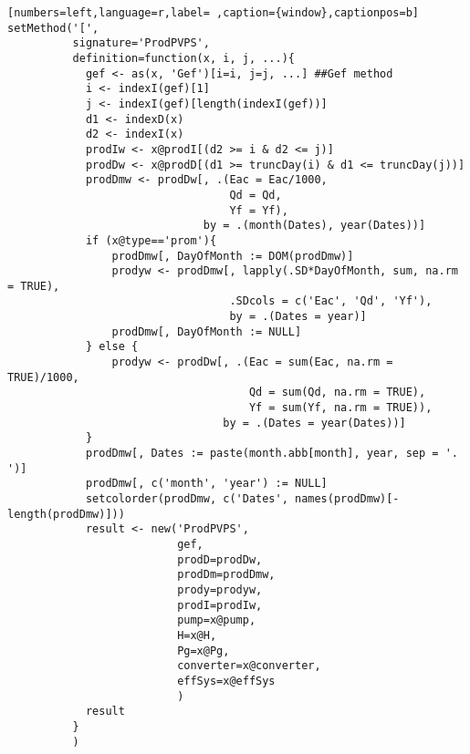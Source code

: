 \begin{lstlisting}[numbers=left,language=r,label= ,caption={window},captionpos=b]
setMethod('[',
          signature='ProdPVPS',
          definition=function(x, i, j, ...){
            gef <- as(x, 'Gef')[i=i, j=j, ...] ##Gef method
            i <- indexI(gef)[1]
            j <- indexI(gef)[length(indexI(gef))]
            d1 <- indexD(x)
            d2 <- indexI(x)
            prodIw <- x@prodI[(d2 >= i & d2 <= j)]
            prodDw <- x@prodD[(d1 >= truncDay(i) & d1 <= truncDay(j))]
            prodDmw <- prodDw[, .(Eac = Eac/1000,
                                  Qd = Qd,
                                  Yf = Yf),
                              by = .(month(Dates), year(Dates))]
            if (x@type=='prom'){
                prodDmw[, DayOfMonth := DOM(prodDmw)]
                prodyw <- prodDmw[, lapply(.SD*DayOfMonth, sum, na.rm = TRUE),
                                  .SDcols = c('Eac', 'Qd', 'Yf'),
                                  by = .(Dates = year)]
                prodDmw[, DayOfMonth := NULL]
            } else {
                prodyw <- prodDw[, .(Eac = sum(Eac, na.rm = TRUE)/1000,
                                     Qd = sum(Qd, na.rm = TRUE),
                                     Yf = sum(Yf, na.rm = TRUE)),
                                 by = .(Dates = year(Dates))]
            }
            prodDmw[, Dates := paste(month.abb[month], year, sep = '. ')]
            prodDmw[, c('month', 'year') := NULL]
            setcolorder(prodDmw, c('Dates', names(prodDmw)[-length(prodDmw)]))
            result <- new('ProdPVPS',
                          gef,
                          prodD=prodDw,
                          prodDm=prodDmw,
                          prody=prodyw,
                          prodI=prodIw,
                          pump=x@pump,
                          H=x@H,
                          Pg=x@Pg,
                          converter=x@converter,
                          effSys=x@effSys
                          )
            result
          }
          )
\end{lstlisting}
